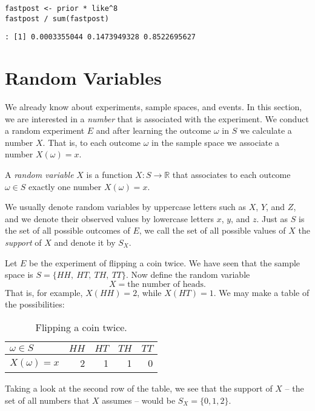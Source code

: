 \begin{Verbatim}
fastpost <- prior * like^8
fastpost / sum(fastpost)
\end{Verbatim}

\begin{verbatim}
: [1] 0.0003355044 0.1473949328 0.8522695627
\end{verbatim}

\section{Random Variables}
\label{sec-4-9}

We already know about experiments, sample spaces, and events. In this
section, we are interested in a \emph{number} that is associated with the
experiment. We conduct a random experiment \(E\) and after learning
the outcome \(\omega\) in \(S\) we calculate a number \(X\). That is,
to each outcome \(\omega\) in the sample space we associate a number
\(X(\omega)=x\).

\begin{defn}
A \emph{random variable} \(X\) is a function \(X:S\to\mathbb{R}\) that
associates to each outcome \(\omega\in S\) exactly one number
\(X(\omega)=x\).
\end{defn}

We usually denote random variables by uppercase letters such as \(X\),
\(Y\), and \(Z\), and we denote their observed values by lowercase
letters \(x\), \(y\), and \(z\). Just as \(S\) is the set of all
possible outcomes of \(E\), we call the set of all possible values of
\(X\) the \emph{support} of \(X\) and denote it by \(S_{X}\).


Let \(E\) be the experiment of flipping a coin twice. We have seen
that the sample space is \( S = \{ HH,\ HT,\ TH,\ TT \} \). Now define
the random variable
\[ X = \mbox{the number of heads} .\]
That is, for
example, \(X(HH)=2\), while \(X(HT)=1\). We may make a table of the
possibilities:

\begin{table}[htb]
\caption[Flipping a coin twice]{\label{tab-flip-coin-twice}Flipping a coin twice.}
\centering
\begin{tabular}{lrrrr}
\(\omega\in S\) & \(HH\) & \(HT\) & \(TH\) & \(TT\)\\
\hline
\(X(\omega)=x\) & 2 & 1 & 1 & 0\\
\end{tabular}
\end{table}

Taking a look at the second row of the table, we see that the support
of \(X\) -- the set of all numbers that \(X\) assumes -- would be \(
S_{X}= \{ 0,1,2 \} \).



